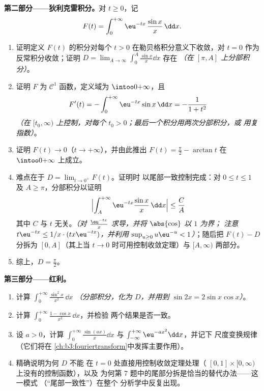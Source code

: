\begin{problem}
\medskip
\noindent\textbf{第二部分——狄利克雷积分。}对 $t
\geq 0$，记
\[
F(t) = \int_0^{+\infty}\eu^{-tx}\,\frac{\sin x}{x}\,\dd x .
\]
\begin{enumerate}[resume]
  \item 证明定义 $F(t)$ 的积分对每个
        $t > 0$ 在勒贝格积分意义下收敛，对 $t = 0$
        作为反常积分收敛；证明 $D =
        \lim_{A\to\infty}\int_0^A\frac{\sin x}x\dd x$ 存在
        \emph{（在 $[\pi, A]$ 上分部积分）}。
  \item 证明 $F$ 为 $\mathcal C^1$ 函数，定义域为
        $\intoo0{+\infty}$，且
        \[
        F'(t) = -\int_0^{+\infty}\eu^{-tx}\sin x\,\dd x
        = -\frac{1}{1 + t^2}
        \]
        \emph{（在 $[t_0, \infty)$ 上控制，对每个 $t_0 >
        0$；最后一个积分用两次分部积分，或
        用复指数）}。
  \item 证明 $F(t) \to 0$（$t \to +\infty$），并由此推出 $F(t)
        = \frac\pi2 - \arctan t$ 在 $\intoo0{+\infty}$ 上成立。
  \item 难点在于 $D = \lim_{t\to0^+}F(t)$。证明时
        以尾部一致控制完成：对 $0 \leq t \leq 1$
        及 $A \geq \pi$，分部积分以证明
        \[
        \Bigl|\int_A^{+\infty}\eu^{-tx}\frac{\sin
        x}x\,\dd x\Bigr| \leq \frac{C}{A}
        \]
        其中 $C$ 与 $t$ 无关。\emph{（对
        $\frac{\eu^{-tx}}x$ 求导，并将 $\abs{\cos}$ 以 $1$ 为界；
        注意 $t\eu^{-tx} \leq 1/x\cdot(tx\eu^{-tx})$，并利用
        $\sup_{u\geq0}u\eu^{-u} < 1$）}；随后把 $F(t) - D$
        分拆为 $[0, A]$（其上当 $t \to 0$ 时可用控制收敛定理）与
        $[A, \infty)$ 两部分。
  \item 综上，$D = \frac\pi2$。
\end{enumerate}

\medskip
\noindent\textbf{第三部分——红利。}
\begin{enumerate}[resume]
  \item 计算 $\int_0^{+\infty}\frac{\sin^2x}{x^2}\,\dd x$
        \emph{（分部积分，化为 $D$，并用到 $\sin
        2x = 2\sin x\cos x$）}。
  \item 计算 $\int_0^{+\infty}\frac{1 -
        \cos x}{x^2}\,\dd x$，并检验
        两个结果是否一致。
  \item 设 $a > 0$，计算
        $\int_0^{+\infty}\frac{\sin(ax)}x\dd x$ 与
        $\int_{-\infty}^{+\infty}\eu^{-ax^2}\dd x$，并记下
        尺度变换规律（它们将在
        \cref{ch:b3:fouriertransform}中发挥主要作用）。
  \item 精确说明为何 $D$ 不能
        在 $t = 0$ 处直接用控制收敛定理处理（
        $[0,1]\times[0,\infty)$ 上没有的控制函数），以及
        为何第 7 题中的尾部分拆是恰当的替代办法——这一模式
        （“尾部一致性”）在整个
        分析学中反复出现。
\end{enumerate}


\end{problem}
